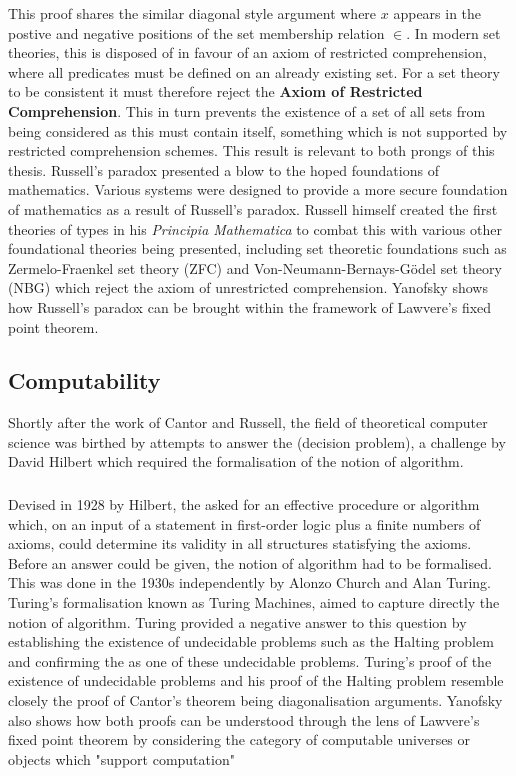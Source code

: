 This proof shares the similar diagonal style argument where $x$ appears in the
postive and negative positions of the set membership relation $\in$. In modern
set theories, this is disposed of in favour of an axiom of restricted
comprehension, where all predicates must be defined on an already existing set.
For a set theory to be consistent it must therefore reject the \textbf{Axiom of
Restricted Comprehension}. This in turn prevents the existence of a set of all
sets from being considered as this must contain itself, something which is not
supported by restricted comprehension schemes. This result is relevant to both
prongs of this thesis. Russell's paradox presented a blow to the hoped
foundations of mathematics. Various systems were designed to provide a more
secure foundation of mathematics as a result of Russell's paradox. Russell
himself created the first theories of types in his \textit{Principia
Mathematica} \cite{russell25} to combat this with various other foundational
theories being presented, including set theoretic foundations such as
Zermelo-Fraenkel set theory (ZFC) and Von-Neumann-Bernays-G{\"o}del set theory
(NBG) which reject the axiom of unrestricted comprehension. Yanofsky
\cite{yanofsky2003universal} shows how Russell's paradox can be brought within
the framework of Lawvere's fixed point theorem.

\subsection{Computability}
Shortly after the work of Cantor and Russell, the field of theoretical computer
science was birthed by attempts to answer the \ent{} (decision
problem), a challenge by David Hilbert \cite{hilbert1928theoretische} which required the formalisation of the
notion of algorithm.

\subsubsection{\ent}

Devised in 1928 by Hilbert, the \ent asked for an effective procedure or
algorithm which, on an input of a statement in first-order logic plus a finite
numbers of axioms, could determine its validity in all structures statisfying
the axioms. Before an answer could be given, the notion of algorithm had to be
formalised. This was done in the 1930s independently by Alonzo Church and Alan
Turing. Turing's formalisation \cite{turing1937computable} known as Turing
Machines, aimed to capture directly the notion of algorithm. Turing provided a
negative answer to this question by establishing the existence of undecidable
problems such as the Halting problem and confirming the \ent as one of these
undecidable problems. Turing's proof of the existence of undecidable problems
and his proof of the Halting problem resemble closely the proof of Cantor's
theorem being diagonalisation arguments. Yanofsky \cite{yanofsky2003universal}
also  shows how both proofs can be understood through the lens of Lawvere's
fixed point theorem by considering the category of computable universes or
objects which "support computation"

